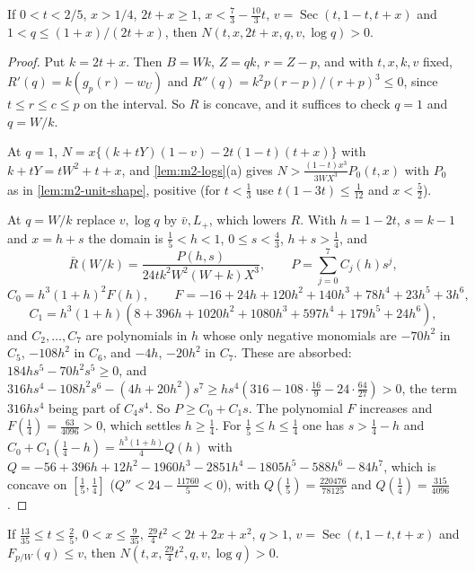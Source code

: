 \begin{lemma}\label{lem:m2-order-face}
If $0<t<2/5$, $x>1/4$, $2t+x\ge1$, $x<\frac73-\frac{10}3t$, $v=\operatorname{Sec}(t,1-t,t+x)$ and
$1<q\le(1+x)/(2t+x)$, then $N(t,x,2t+x,q,v,\log q)>0$.
\end{lemma}

\begin{proof}
Put $k=2t+x$. Then $B=Wk$, $Z=qk$, $r=Z-p$, and with $t,x,k,v$ fixed,
$R'(q)=k(g_p(r)-w_U)$ and $R''(q)=k^2p(r-p)/(r+p)^3\le0$, since $t\le r\le c\le p$ on the interval.
So $R$ is concave, and it suffices to check $q=1$ and $q=W/k$.

At $q=1$, $N=x\{(k+tY)(1-v)-2t(1-t)(t+x)\}$ with $k+tY=tW^2+t+x$, and \cref{lem:m2-logs}(a) gives
$N>\frac{(1-t)x^3}{3WX^3}P_0(t,x)$ with $P_0$ as in \cref{lem:m2-unit-shape}, positive (for $t<\frac13$
use $t(1-3t)\le\frac1{12}$ and $x<\frac52$).

At $q=W/k$ replace $v,\log q$ by $\bar v,L_+$, which lowers $R$. With $h=1-2t$, $s=k-1$ and $x=h+s$
the domain is $\frac15<h<1$, $0\le s<\frac43$, $h+s>\frac14$, and
\[
\bar R(W/k)=\frac{P(h,s)}{24tk^2W^2(W+k)X^3},\qquad P=\sum_{j=0}^7C_j(h)s^j,
\]
\[
C_0=h^3(1+h)^2F(h),\qquad F=-16+24h+120h^2+140h^3+78h^4+23h^5+3h^6,
\]
\[
C_1=h^3(1+h)(8+396h+1020h^2+1080h^3+597h^4+179h^5+24h^6),
\]
and $C_2,\dots,C_7$ are polynomials in $h$ whose only negative monomials are $-70h^2$ in $C_5$,
$-108h^2$ in $C_6$, and $-4h$, $-20h^2$ in $C_7$. These are absorbed: $184hs^5-70h^2s^5\ge0$, and
$316hs^4-108h^2s^6-(4h+20h^2)s^7\ge hs^4(316-108\cdot\frac{16}9-24\cdot\frac{64}{27})>0$, the term
$316hs^4$ being part of $C_4s^4$. So $P\ge C_0+C_1s$. The polynomial $F$ increases and
$F(\frac14)=\frac{63}{4096}>0$, which settles $h\ge\frac14$. For $\frac15\le h\le\frac14$ one has
$s>\frac14-h$ and $C_0+C_1(\frac14-h)=\frac{h^3(1+h)}4Q(h)$ with
$Q=-56+396h+12h^2-1960h^3-2851h^4-1805h^5-588h^6-84h^7$, which is concave on $[\frac15,\frac14]$
($Q''<24-\frac{11760}5<0$), with $Q(\frac15)=\frac{220476}{78125}$ and $Q(\frac14)=\frac{315}{4096}$.
\end{proof}

\begin{lemma}\label{lem:m2-strip}
If $\frac{13}{35}\le t\le\frac25$, $0<x\le\frac9{35}$, $\frac{29}4t^2<2t+2x+x^2$, $q>1$,
$v=\operatorname{Sec}(t,1-t,t+x)$ and $F_{p/W}(q)\le v$, then $N(t,x,\frac{29}4t^2,q,v,\log q)>0$.
\end{lemma}

